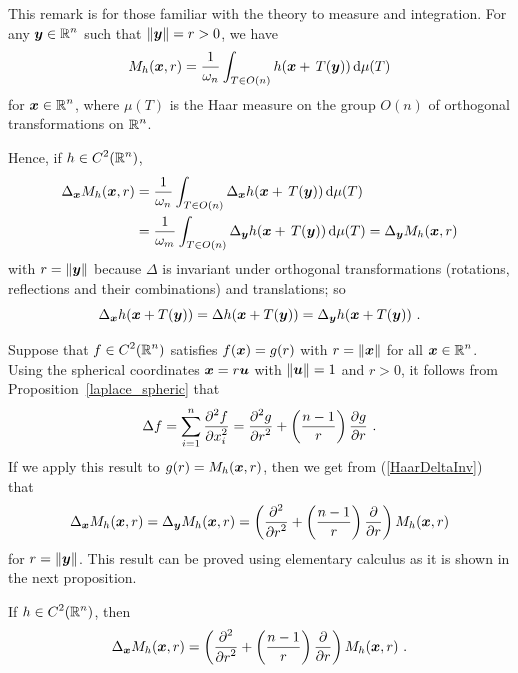 \begin{rmk}
This remark is for those familiar with the theory to measure and
integration.
For any $\displaystyle {\bm{y}} \in \mathbb{R}^n$ such that
$\|{\bm{y}}\| = r> 0$, we have
\[
M_h({\bm{x}},r) =
\frac{1}{\omega_n} \int_{T\in O(n)} h({\bm{x}}+\,T({\bm{y}}))
\,\mathrm{d}{\mu(T)}
\]
for $\displaystyle {\bm{x}}\in\mathbb{R}^n$,
where $\mu(T)$ is the Haar measure on the group $O(n)$ of orthogonal
transformations on $\displaystyle \mathbb{R}^n$.

Hence, if $\displaystyle h \in C^2(\mathbb{R}^n)$,
\begin{align}
\Delta_{{\bm{x}}} M_h({\bm{x}},r)
&= \frac{1}{\omega_n} \int_{T\in O(n)} \Delta_{{\bm{x}}} h({\bm{x}}+\,T({\bm{y}}))
\,\mathrm{d}{\mu(T)} \nonumber \\
&= \frac{1}{\omega_m} \int_{T\in O(n)} \Delta_{{\bm{y}}} h({\bm{x}}+\,T({\bm{y}}))
\,\mathrm{d}{\mu(T)}
= \Delta_{{\bm{y}}} M_h({\bm{x}},r) \label{HaarDeltaInv}
\end{align}
with $r = \|{\bm{y}}\|$ because $\Delta$ is invariant under orthogonal
transformations (rotations, reflections and their combinations) and
translations; so
\[
\Delta_{{\bm{x}}} h({\bm{x}}+T({\bm{y}})) = \Delta h({\bm{x}}+T({\bm{y}}))
= \Delta_{{\bm{y}}} h({\bm{x}}+T({\bm{y}})) \ .
\]

Suppose that $\displaystyle f \in C^2(\mathbb{R}^n)$ satisfies $f({\bm{x}}) = g(r)$ with
$r=\|{\bm{x}}\|$ for all $\displaystyle {\bm{x}} \in \mathbb{R}^n$.
Using the spherical coordinates ${\bm{x}} = r {\bm{u}}$ with
$\|{\bm{u}}\|= 1$ and $r>0$, it follows from
Proposition~\ref{laplace_spheric} that
\[
  \Delta f = \sum_{i=1}^n \pdydxn{f}{x_i}{2} 
= \pdydxn{g}{r}{2} + \left(\frac{n-1}{r}\right) \pdydx{g}{r} \ .
\]
If we apply this result to $g(r) = M_h({\bm{x}},r)$, 
then we get from (\ref{HaarDeltaInv}) that
\[
\Delta_{{\bm{x}}} M_h({\bm{x}},r) = \Delta_{{\bm{y}}} M_h({\bm{x}},r)
= \left( \frac{\displaystyle \partial^{2}{}} {\displaystyle \partial r^{2}} + \left(\frac{n-1}{r}\right) \frac{\partial{}}{\partial r} \right)
M_h({\bm{x}},r)
\]
for $r = \|{\bm{y}}\|$.  This result can be proved using elementary
calculus as it is shown in the next proposition.
\end{rmk}

\begin{prop} \label{wave_sol_pr1}
If $\displaystyle h \in C^2(\mathbb{R}^n)$, then
\[
\Delta_{{\bm{x}}} M_h({\bm{x}},r)
= \left( \frac{\displaystyle \partial^{2}{}} {\displaystyle \partial r^{2}} + \left(\frac{n-1}{r}\right) \frac{\partial{}}{\partial r} \right)
M_h({\bm{x}},r) \ .
\]
\end{prop}

